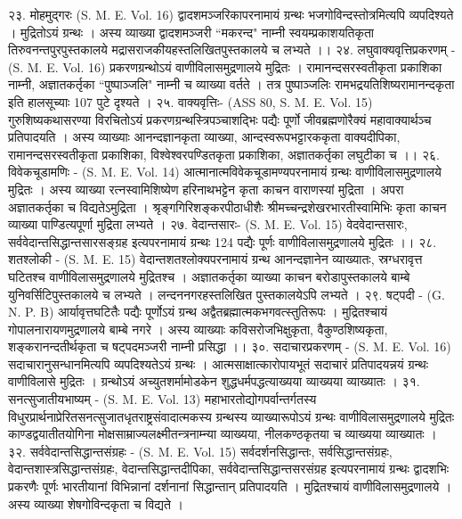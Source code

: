 २३. मोहमुद्गरः (S. M. E. Vol. 16)
द्वादशमञ्जरिकापरनामायं ग्रन्थः भजगोविन्दस्तोत्रमित्यपि व्यपदिश्यते । मुद्रितोऽयं ग्रन्थः । अस्य व्याख्या द्वादशमञ्जरी ``मकरन्द" नाम्नी स्वयम्प्रकाशयतिकृता तिरुवनन्तपुरपुस्तकालये मद्रासराजकीयहस्तलिखितपुस्तकालये च लभ्यते ।।
२४. लघुवाक्यवृत्तिप्रकरणम् - (S. M. E. Vol. 16)
प्रकरणग्रन्थोऽयं वाणीविलासमुद्रणालये मुद्रितः । रामानन्दसरस्वतीकृता प्रकाशिका नाम्नी, अज्ञातकर्तृका ``पुष्पाञ्जलि" नाम्नी च व्याख्या वर्तते । तत्र पुष्पाञ्जलिः रामभद्रयतिशिष्यरामानन्दकृता इति हालसूच्याः 107 पुटे दृश्यते ।
२५. वाक्यवृत्तिः- (ASS 80, S. M. E. Vol. 15)
गुरुशिष्यकथासरण्या विरचितोऽयं प्रकरणग्रन्थस्त्रिपञ्चाशद्भिः पद्यैः पूर्णो जीवब्रह्मणोरैक्यं महावाक्यार्थञ्च प्रतिपादयति । अस्य व्याख्याः आनन्दज्ञानकृता व्याख्या, आन्दस्वरूपभट्टारककृता वाक्यदीपिका, रामानन्दसरस्वतीकृता प्रकाशिका, विश्वेश्वरपण्डितकृता प्रकाशिका, अज्ञातकर्तृका लघुटीका च ।।
२६. विवेकचूडामणिः - (S. M. E. Vol. 14)
आत्मानात्मविवेकचूडामण्यपरनामायं ग्रन्थः वाणीविलासमुद्रणालये मुद्रितः । अस्य व्याख्या रत्नस्वामिशिष्येण हरिनाथभट्टेन कृता काचन वाराणस्यां मुद्रिता । अपरा अज्ञातकर्तृका च विद्यतेऽमुद्रिता । श्रृङ्गगिरिशङ्करपीठाधीशैः श्रीमच्चन्द्रशेखरभारतीस्वामिभिः कृता काचन व्याख्या पाण्डित्यपूर्णा मुद्रिता लभ्यते ।
२७. वेदान्तसारः- (S. M. E. Vol. 15)
वेदवेदान्तसारः, सर्ववेदान्तसिद्धान्तसारसङ्ग्रह इत्यपरनामायं ग्रन्थः 124 पद्यैः पूर्णः वाणीविलासमुद्रणालये मुद्रितः ।।
२८. शतश्लोकी - (S. M. E. 15)
वेदान्तशतश्लोक्यपरनामायं ग्रन्थ आनन्दज्ञानेन व्याख्यातः, स्रग्धरावृत्त घटितश्च वाणीविलासमुद्रणालये मुद्रितश्च । अज्ञातकर्तृका व्याख्या काचन बरोडापुस्तकालये बाम्बे युनिवर्सिटिपुस्तकालये च लभ्यते । लन्दननगरहस्तलिखित पुस्तकालयेऽपि लभ्यते ।
२९. षट्पदी - (G. N. P. B)
आर्यावृत्तघटितैः पद्यैः पूर्णोऽयं ग्रन्थ अद्वैतब्रह्मात्मकभगवत्स्तुतिरूपः । मुद्रितश्चायं गोपालनारायणमुद्रणालये बाम्बे नगरे । अस्य व्याख्याः कविसरोजभिक्षुकृता, वैकुण्ठशिष्यकृता, शङ्करानन्दतीर्थकृता च षट्पदमञ्जरी नाम्नी प्रसिद्धा ।।
३०. सदाचारप्रकरणम् - (S. M. E. Vol. 16)
सदाचारानुसन्धानमित्यपि व्यपदिश्यतेऽयं ग्रन्थः । आत्मसाक्षात्कारोपायभूतं सदाचारं प्रतिपादयन्नयं ग्रन्थः वाणीविलासे मुद्रितः । ग्रन्थोऽयं अच्युतशर्मामोडकेन शुद्धधर्मपद्धत्याख्यया व्याख्यया व्याख्यातः ।
३१. सनत्सुजातीयभाष्यम् - (S. M. E. Vol. 13)
महाभारतोद्योगपर्वान्तर्गतस्य विधुरप्रार्थनाप्रेरितसनत्सुजातधृतराष्ट्रसंवादात्मकस्य ग्रन्थस्य व्याख्यारूपोऽयं ग्रन्थः वाणीविलासमुद्रणालये मुद्रितः काण्डद्वयातीतयोगिना मोक्षसाम्राज्यलक्ष्मीतन्त्रनाम्न्या व्याख्यया, नीलकण्ठकृतया च व्याख्यया व्याख्यातः ।
३२. सर्ववेदान्तसिद्धान्तसंग्रहः - (S. M. E. Vol. 15)
सर्वदर्शनसिद्धान्तः, सर्वसिद्धान्तसंग्रहः, वेदान्तशास्त्रसिद्धान्तसंग्रहः, वेदान्तसिद्धान्तदीपिका, सर्ववेदान्तसिद्धान्तसरसंग्रह इत्यपरनामायं ग्रन्थः द्वादशभिः प्रकरणैः पूर्णः भारतीयानां विभिन्नानां दर्शनानां सिद्धान्तान् प्रतिपादयति । मुद्रितश्चायं वाणीविलासमुद्रणालये । अस्य व्याख्या शेषगोविन्दकृता च विद्यते ।
